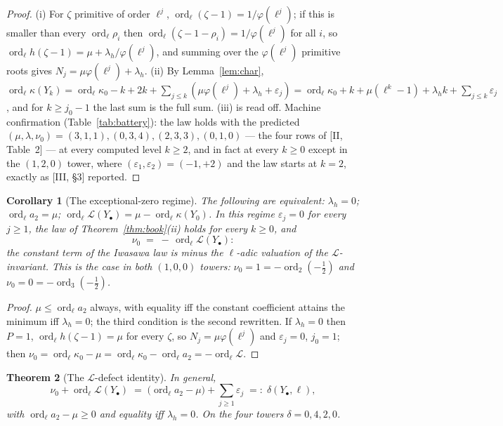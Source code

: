 \documentclass[11pt]{amsart}
\numberwithin{equation}{section}
\newtheorem{theorem}{Theorem}[section]
\newtheorem{corollary}[theorem]{Corollary}
\theoremstyle{definition}
\theoremstyle{remark}
\newcommand{\cL}{\mathcal{L}}
\newcommand{\ord}{\operatorname{ord}}
\begin{document}
\begin{proof}
(i) For $\zeta$ primitive of order $\ell^{j}$, $\ord_\ell(\zeta-1)=1/\varphi(\ell^{j})$;
if this is smaller than every $\ord_\ell\rho_i$ then
$\ord_\ell(\zeta-1-\rho_i)=1/\varphi(\ell^{j})$ for all $i$, so
$\ord_\ell h(\zeta-1)=\mu+\lambda_h/\varphi(\ell^{j})$, and summing over the
$\varphi(\ell^{j})$ primitive roots gives $N_j=\mu\varphi(\ell^{j})+\lambda_h$. (ii) By
Lemma~\ref{lem:char},
$\ord_\ell\kappa(Y_k)=\ord_\ell\kappa_0-k+2k+\sum_{j\le k}(\mu\varphi(\ell^{j})
+\lambda_h+\varepsilon_j)=\ord_\ell\kappa_0+k+\mu(\ell^{k}-1)+\lambda_hk
+\sum_{j\le k}\varepsilon_j$, and for $k\ge j_0-1$ the last sum is the full sum. (iii)
is read off. Machine confirmation (Table~\ref{tab:battery}): the law holds with the
predicted $(\mu,\lambda,\nu_0)=(3,1,1),(0,3,4),(2,3,3),(0,1,0)$ --- the four rows of
[II, Table~2] --- at every computed level $k\ge2$, and in fact at every $k\ge0$ except
in the $(1,2,0)$ tower, where $(\varepsilon_1,\varepsilon_2)=(-1,+2)$ and the law
starts at $k=2$, exactly as [III, \S3] reported.
\end{proof}

\begin{corollary}[The exceptional-zero regime]\label{cor:regime}
The following are equivalent: $\lambda_h=0$; $\ord_\ell a_2=\mu$;
$\ord_\ell\cL(Y_\bullet)=\mu-\ord_\ell\kappa(Y_0)$. In this regime $\varepsilon_j=0$ for
every $j\ge1$, the law of Theorem~\ref{thm:book}(ii) holds for every $k\ge0$, and
\[
\nu_0\;=\;-\,\ord_\ell\cL(Y_\bullet):
\]
the constant term of the Iwasawa law is minus the $\ell$-adic valuation of the
$\cL$-invariant. This is the case in both $(1,0,0)$ towers: $\nu_0=1=-\ord_2(-\tfrac12)$
and $\nu_0=0=-\ord_3(-\tfrac12)$.
\end{corollary}

\begin{proof}
$\mu\le\ord_\ell a_2$ always, with equality iff the constant coefficient attains the
minimum iff $\lambda_h=0$; the third condition is the second rewritten. If $\lambda_h=0$
then $P=1$, $\ord_\ell h(\zeta-1)=\mu$ for every $\zeta$, so $N_j=\mu\varphi(\ell^{j})$
and $\varepsilon_j=0$, $j_0=1$; then $\nu_0=\ord_\ell\kappa_0-\mu
=\ord_\ell\kappa_0-\ord_\ell a_2=-\ord_\ell\cL$.
\end{proof}

\begin{theorem}[The $\cL$-defect identity]\label{thm:defect}
In general,
\[
\nu_0+\ord_\ell\cL(Y_\bullet)\;=\;\bigl(\ord_\ell a_2-\mu\bigr)+\sum_{j\ge1}\varepsilon_j
\;=:\;\delta(Y_\bullet,\ell),
\]
with $\ord_\ell a_2-\mu\ge0$ and equality iff $\lambda_h=0$. On the four towers
$\delta=0,4,2,0$.
\end{theorem}
\end{document}
